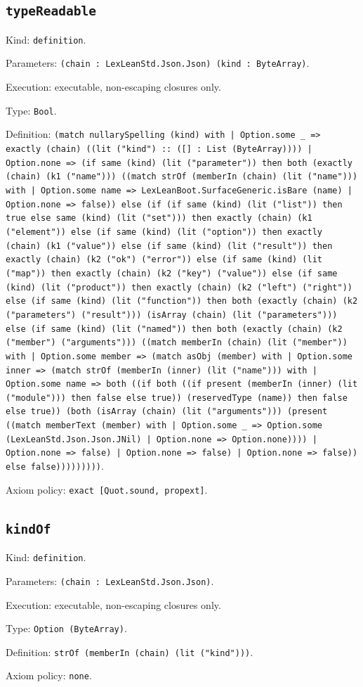 \documentclass[11pt]{article}
\begin{document}
\subsection*{\texttt{typeReadable}}
\noindent Kind: \texttt{definition}.\par
\noindent Parameters: \texttt{(chain : LexLeanStd.Json.Json) (kind : ByteArray)}.\par
\noindent Execution: executable, non-escaping closures only.\par
\noindent Type: \texttt{Bool}.\par
\noindent Definition: \texttt{(match nullarySpelling (kind) with | Option.some \_ => exactly (chain) ((lit ("kind") :: ([] : List (ByteArray)))) | Option.none => (if same (kind) (lit ("parameter")) then both (exactly (chain) (k1 ("name"))) ((match strOf (memberIn (chain) (lit ("name"))) with | Option.some name => LexLeanBoot.SurfaceGeneric.isBare (name) | Option.none => false)) else (if (if same (kind) (lit ("list")) then true else same (kind) (lit ("set"))) then exactly (chain) (k1 ("element")) else (if same (kind) (lit ("option")) then exactly (chain) (k1 ("value")) else (if same (kind) (lit ("result")) then exactly (chain) (k2 ("ok") ("error")) else (if same (kind) (lit ("map")) then exactly (chain) (k2 ("key") ("value")) else (if same (kind) (lit ("product")) then exactly (chain) (k2 ("left") ("right")) else (if same (kind) (lit ("function")) then both (exactly (chain) (k2 ("parameters") ("result"))) (isArray (chain) (lit ("parameters"))) else (if same (kind) (lit ("named")) then both (exactly (chain) (k2 ("member") ("arguments"))) ((match memberIn (chain) (lit ("member")) with | Option.some member => (match asObj (member) with | Option.some inner => (match strOf (memberIn (inner) (lit ("name"))) with | Option.some name => both ((if both ((if present (memberIn (inner) (lit ("module"))) then false else true)) (reservedType (name)) then false else true)) (both (isArray (chain) (lit ("arguments"))) (present ((match memberText (member) with | Option.some \_ => Option.some (LexLeanStd.Json.Json.JNil) | Option.none => Option.none)))) | Option.none => false) | Option.none => false) | Option.none => false)) else false)))))))))}.\par
\noindent Axiom policy: \texttt{exact [Quot.sound, propext]}.\par
\subsection*{\texttt{kindOf}}
\noindent Kind: \texttt{definition}.\par
\noindent Parameters: \texttt{(chain : LexLeanStd.Json.Json)}.\par
\noindent Execution: executable, non-escaping closures only.\par
\noindent Type: \texttt{Option (ByteArray)}.\par
\noindent Definition: \texttt{strOf (memberIn (chain) (lit ("kind")))}.\par
\noindent Axiom policy: \texttt{none}.\par
\end{document}
